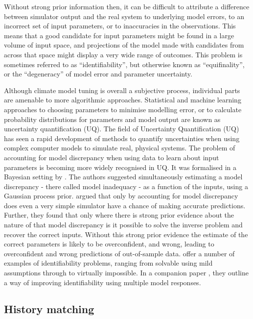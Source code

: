 \documentclass[gmd, manuscript]{copernicus}
\begin{document}
Without strong prior information then, it can be difficult to attribute a difference between simulator output and the real system to underlying model errors, to an incorrect set of input parameters, or to inaccuracies in the observations. This means that a good candidate for input parameters might be found in a large volume of input space, and projections of the model made with candidates from across that space might display a very wide range of outcomes. This problem is sometimes referred to as ``identifiability'', but otherwise known as ``equifinality'', or the ``degeneracy'' of model error and parameter uncertainty. 

Although climate model tuning is overall a subjective process, individual parts are amenable to more algorithmic approaches. Statistical and machine learning approaches to choosing parameters to minimise modelling error, or to calculate probability distributions for parameters and model output are known as uncertainty quantification (UQ). The field of Uncertainty Quantification (UQ) has seen a rapid development of methods to quantify uncertainties when using complex computer models to simulate real, physical systems. The problem of accounting for model discrepancy when using data to learn about input parameters is becoming more widely recognised in UQ. It was formalised in a Bayesian setting by \cite{kennedy2001bayesian}. The authors suggested simultaneously estimating a model discrepancy  - there called model inadequacy - as a function of the inputs, using a Gaussian process prior. \cite{brynjarsdottir2014learning} argued that only by accounting for model discrepancy does even a very simple simulator have a chance of making accurate predictions. Further, they found that only where there is strong prior evidence about the nature of that model discrepancy is it possible to solve the inverse problem and recover the correct inputs. Without this strong prior evidence the estimate of the correct parameters is likely to be overconfident, and wrong, leading to overconfident and wrong predictions of out-of-sample data. \cite{arendt2012quantification} offer a number of examples of identifiability problems, ranging from solvable using mild assumptions through to virtually impossible. In a companion paper \citep{arendt2012improving}, they outline a way of improving identifiability using multiple model responses. 

\subsection{History matching}
\end{document}
